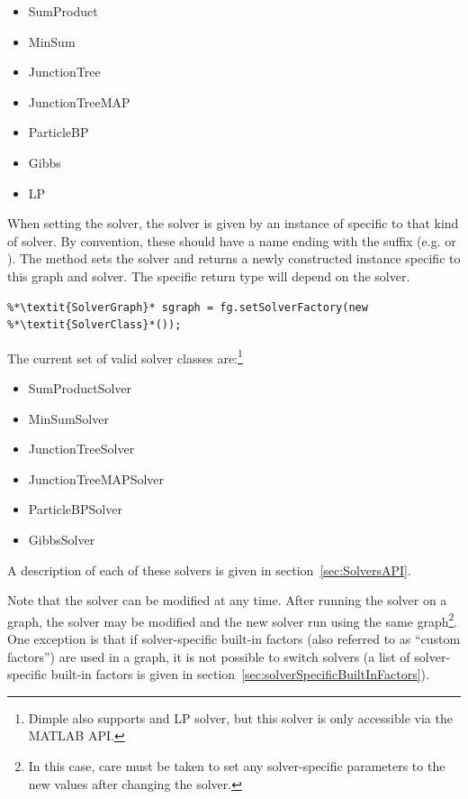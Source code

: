 \begin{itemize}
\item SumProduct
\item MinSum
\item JunctionTree
\item JunctionTreeMAP
\item ParticleBP
\item Gibbs
\item LP
\end{itemize}

\fi

\ifjava
When setting the solver, the solver is given by an instance of  specific to that kind of solver. By convention, these should have a name ending with the suffix  (e.g.  or ). The method  sets the solver and returns a newly constructed  instance specific to this graph and solver. The specific return type will depend on the solver.

\begin{lstlisting}
%*\textit{SolverGraph}* sgraph = fg.setSolverFactory(new %*\textit{SolverClass}*());
\end{lstlisting}

The current set of valid solver classes are:\footnote{Dimple also supports and LP solver, but this solver is only accessible via the MATLAB API.}

\begin{itemize}
\item SumProductSolver
\item MinSumSolver
\item JunctionTreeSolver
\item JunctionTreeMAPSolver
\item ParticleBPSolver
\item GibbsSolver
\end{itemize}

\fi


A description of each of these solvers is given in section~\ref{sec:SolversAPI}.

Note that the solver can be modified at any time.  After running the solver on a graph, the solver may be modified and the new solver run using the same graph\footnote{In this case, care must be taken to set any solver-specific parameters to the new values after changing the solver.}.  One exception is that if solver-specific built-in factors (also referred to as ``custom factors'') are used in a graph, it is not possible to switch solvers (a list of solver-specific built-in factors is given in section~\ref{sec:solverSpecificBuiltInFactors}).


